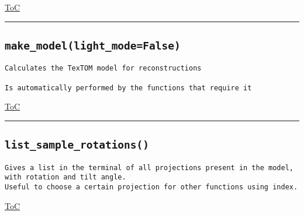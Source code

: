 \documentclass{article}
\begin{document}
\begin{flushright}

\hyperref[toc]{ToC}

\end{flushright}



\vspace{5mm}

\hrule

\subsection*{\texttt{make\_model(light\_mode=False)}}
\label{fun:makemodel}

\begin{lstlisting}[language=docstring]
Calculates the TexTOM model for reconstructions

Is automatically performed by the functions that require it
\end{lstlisting}

\begin{flushright}

\hyperref[toc]{ToC}

\end{flushright}



\vspace{5mm}

\hrule

\subsection*{\texttt{list\_sample\_rotations()}}
\label{fun:listsamplerotations}

\begin{lstlisting}[language=docstring]
Gives a list in the terminal of all projections present in the model, with rotation and tilt angle. 
Useful to choose a certain projection for other functions using index.
\end{lstlisting}

\begin{flushright}

\hyperref[toc]{ToC}

\end{flushright}


\end{document}
